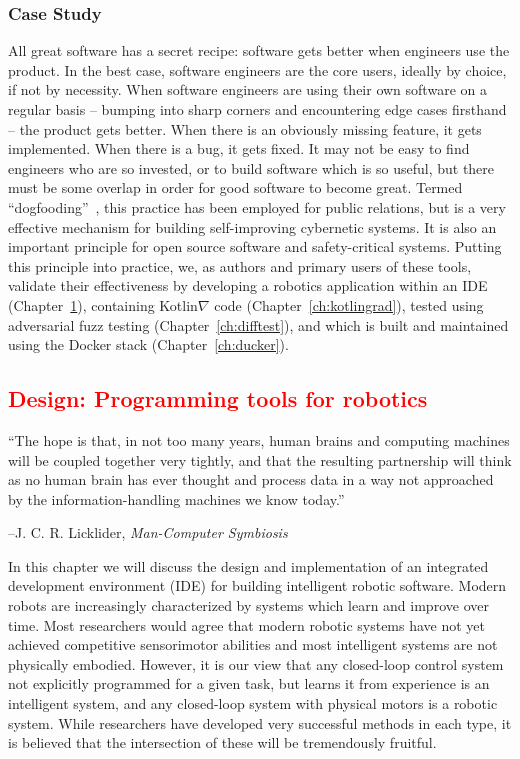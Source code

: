 \documentclass[12pt,initial,twoside,maitrise]{dms}
\newcommand{\rare}[1]{\textcolor{red}{#1}}
\numberwithin{equation}{section}
\numberwithin{table}{chapter}
\numberwithin{figure}{chapter}
\begin{document}
\subsection{Case Study}\label{subsec:case-study}

All great software has a secret recipe: software gets better when engineers use the product. In the best case, software engineers are the core users, ideally by choice, if not by necessity. When software engineers are using their own software on a regular basis -- bumping into sharp corners and encountering edge cases firsthand -- the product gets better. When there is an obviously missing feature, it gets implemented. When there is a bug, it gets fixed. It may not be easy to find engineers who are so invested, or to build software which is so useful, but there must be some overlap in order for good software to become great. Termed ``dogfooding''~\cite{harrison2006eating}, this practice has been employed for public relations, but is a very effective mechanism for building self-improving cybernetic systems. It is also an important principle for open source software and safety-critical systems. Putting this principle into practice, we, as authors and primary users of these tools, validate their effectiveness by developing a robotics application within an IDE (Chapter~\ref{ch:hatchery}), containing Kotlin$\nabla$ code (Chapter~\ref{ch:kotlingrad}), tested using adversarial fuzz testing (Chapter~\ref{ch:difftest}), and which is built and maintained using the Docker stack (Chapter~\ref{ch:ducker}).

\rare{\chapter{Design: Programming tools for robotics}\label{ch:hatchery}}
\setlength{\epigraphwidth}{0.78\textwidth}
\epigraph{``The hope is that, in not too many years, human brains and computing machines will be coupled together very tightly, and that the resulting partnership will think as no human brain has ever thought and process data in a way not approached by the information-handling machines we know today.''}{\begin{flushright}--J. C. R. Licklider, \textit{Man-Computer Symbiosis}~\cite{licklider1960man}\end{flushright}}

In this chapter we will discuss the design and implementation of an integrated development environment (IDE) for building intelligent robotic software. Modern robots are increasingly characterized by systems which learn and improve over time. Most researchers would agree that modern robotic systems have not yet achieved competitive sensorimotor abilities and most intelligent systems are not physically embodied. However, it is our view that any closed-loop control system not explicitly programmed for a given task, but learns it from experience is an intelligent system, and any closed-loop system with physical motors is a robotic system. While researchers have developed very successful methods in each type, it is believed that the intersection of these will be tremendously fruitful.
\end{document}
